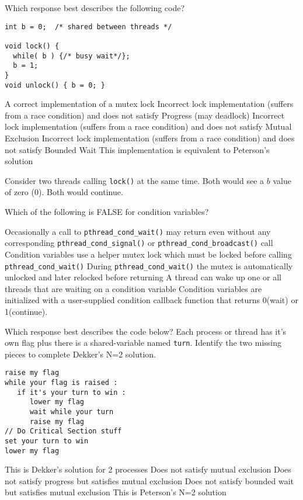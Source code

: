 \variant
Which response best describes the following code?
\begin{verbatim}
int b = 0;  /* shared between threads */

void lock() { 
  while( b ) {/* busy wait*/}; 
  b = 1;
}
void unlock() { b = 0; }
\end{verbatim}
\begin{answers}
\answer A correct implementation of a mutex lock
\answer Incorrect lock implementation (suffers from a race condition) and does not satisfy Progress (may deadlock)
\correctanswer  Incorrect lock implementation (suffers from a race condition) and does not satisfy Mutual Exclusion
\answer  Incorrect lock implementation (suffers from a race condition) and does not satisfy Bounded Wait
\answer This implementation is equivalent to Peterson's solution
\end{answers}
\begin{solution}
Consider two threads calling {\tt lock()} at the same time. Both would see a $b$ value of zero (0). Both would continue. 
\end{solution}


\variant
Which of the following is FALSE for condition variables?
\begin{answers}
\answer Occasionally a call to {\tt pthread_cond_wait()} may return even without any corresponding {\tt pthread_cond_signal()} or {\tt pthread_cond_broadcast()} call
\answer Condition variables use a helper mutex lock which must be locked before calling {\tt pthread_cond_wait()} 
\answer During {\tt pthread_cond_wait()} the mutex is automatically unlocked and later relocked before returning
\answer A thread can wake up one or all threads that are waiting on a condition variable
\correctanswer Condition variables are initialized with a user-supplied condition callback function that returns 0(wait) or 1(continue).
\end{answers}
\begin{solution}
\end{solution}


\variant
Which response best describes the code below? Each process or thread has it's own flag plus there is a shared-variable named {\tt turn}.
Identify the two missing pieces to complete Dekker's N=2 solution.
\begin{verbatim}
raise my flag
while your flag is raised :
   if it's your turn to win :
      lower my flag
      wait while your turn
      raise my flag
// Do Critical Section stuff
set your turn to win
lower my flag
\end{verbatim}
\begin{answers}
\correctanswer  This is Dekker's solution for 2 processes
\answer Does not satisfy mutual exclusion
\answer Does not satisfy progress but satisfies mutual exclusion
\answer Does not satisfy bounded wait but satisfies mutual exclusion
\answer This is Peterson's N=2 solution
\end{answers}
\begin{solution}
\end{solution}




